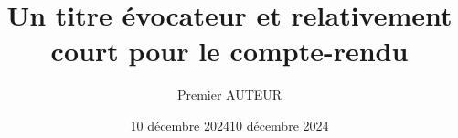 \documentclass[french,]{compterendu}
\title{Un titre évocateur et relativement court pour le compte-rendu}
\author{Premier AUTEUR}
\date{10 décembre 2024}
\date{10 décembre 2024}
\theoremstyle{urcastyle}
\theoremstyle{remark}
\begin{document}

\newtheorem{lemme}{Lemme}[section]
\newtheorem{theoreme}{Théorème}[section]
\newtheorem{corollaire}{Corollaire}[section]
\newtheorem{propriete}{Propriété}[section]
\newtheorem{proprietes}{Propriétés}[section]



\maketitle

% 
% 
\end{document}
